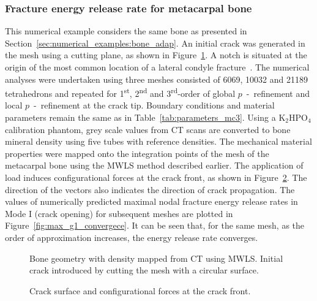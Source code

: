 \documentclass[review]{elsarticle}
\numberwithin{equation}{section}
\begin{document}
\subsubsection{Fracture energy release rate for metacarpal bone} \label{sec:mc3_release_eng}
This numerical example considers the same bone as presented in Section~\ref{sec:numerical_examples:bone_adap}. 
An initial crack was generated in the mesh using a cutting plane, as shown in Figure~\ref{fig:bone_ct_mesh_cut}. A notch is situated at the origin of the most common location of a lateral condyle fracture~\citep{jacklin2012frequency}. 
The numerical analyses were undertaken using three meshes consisted of 6069, 10032 and 21189 tetrahedrons and repeated for 1\textsuperscript{st}, 2\textsuperscript{nd} and 3\textsuperscript{rd}-order of global $p$~-~refinement and local $p$~-~refinement at the crack tip. 
Boundary conditions and material parameters remain the same as in Table~\ref{tab:parameters_mc3}. 
Using a $\mathrm {K_2 HPO_4}$ calibration phantom, grey scale values from CT scans are converted to bone mineral density using five tubes with reference densities. 
The mechanical material properties were mapped onto the integration points of the mesh of the metacarpal bone using the MWLS method described earlier. 
The application of load induces configurational forces at the crack front, as shown in Figure~\ref{fig:crackfrontforce}. 
The direction of the vectors also indicates the direction of crack propagation.
The values of numerically predicted maximal nodal fracture energy release rates in Mode I (crack opening) for subsequent meshes are plotted in Figure~\ref{fig:max_g1_convergece}. 
It can be seen that, for the same mesh, as the order of approximation increases, the energy release rate converges. 
\begin{figure}[h]
	\centering
		\def\svgwidth{10cm}
		
	\caption{Bone geometry with density mapped from CT using MWLS. Initial crack introduced by cutting the mesh with a circular surface.}
	\label{fig:bone_ct_mesh_cut}
\end{figure}

\begin{figure}[h!]
	\centering
	\def\svgwidth{12cm}
	
	\caption{Crack surface and configurational forces at the crack front.}
	\label{fig:crackfrontforce}
\end{figure}
\end{document}

